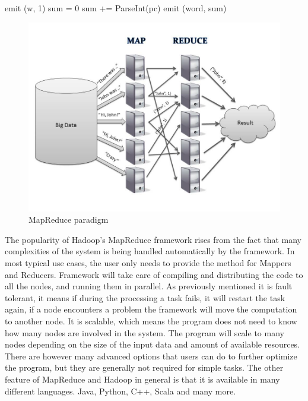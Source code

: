 \documentclass[english]{tktltiki}
\begin{document}
\begin{algorithm}
\begin{algorithmic}
      		\State emit (w, 1)
   \EndFor
\EndFunction
\State 
{}
  \State sum = 0
    \State sum += ParseInt(pc)
    \State emit (word, sum)
\EndFor
\EndFunction
\end{algorithmic}
\end{algorithm}

\begin{figure}[ht!]
\centering
\includegraphics[width=130mm]{figures/mapreduce.jpg}
\caption{MapReduce paradigm}
\end{figure}

The popularity of Hadoop's MapReduce framework rises from the fact that many complexities of the system is being handled automatically by the framework. In most typical use cases, the user only needs to provide the method for Mappers and Reducers. Framework will take care of compiling and distributing the code to all the nodes, and running them in parallel. As previously mentioned it is fault tolerant, it means if during the processing a task fails, it will restart the task again, if a node encounters a problem the framework will move the computation to another node. It is scalable, which means the program does not need to know how many nodes are involved in the system. The program will scale to many nodes depending on the size of the input data and amount of available resources. There are however many advanced options that users can do to further optimize the program, but they are generally not required for simple tasks. The other feature of MapReduce and Hadoop in general is that it is available in many different languages. Java, Python, C++, Scala and many more. 
\end{document}
